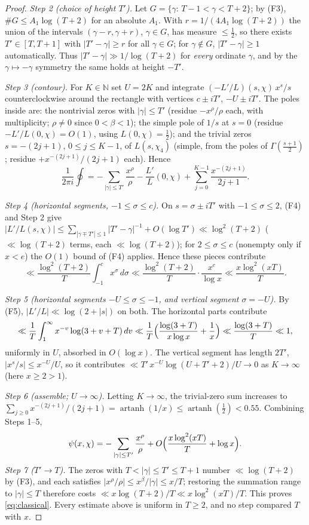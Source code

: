 \begin{proof}
\emph{Step 2 (choice of height $T'$).} Let
$G=\{\gamma:\,T-1<\gamma<T+2\}$; by (F3), $\#G\le A_1\log(T+2)$ for an
absolute $A_1$. With $r=1/(4A_1\log(T+2))$ the union of the intervals
$(\gamma-r,\gamma+r)$, $\gamma\in G$, has measure $\le\tfrac12$, so
there exists $T'\in[T,T+1]$ with $|T'-\gamma|\ge r$ for all
$\gamma\in G$; for $\gamma\notin G$, $|T'-\gamma|\ge1$ automatically.
Thus $|T'-\gamma|\gg1/\log(T+2)$ for \emph{every} ordinate $\gamma$,
and by the $\gamma\mapsto-\gamma$ symmetry the same holds at height
$-T'$.

\emph{Step 3 (contour).} For $K\in\mathbb N$ set $U=2K$ and integrate
$(-L'/L)(s,\chi)\,x^s/s$ counterclockwise around the rectangle with
vertices $c\pm iT'$, $-U\pm iT'$. The poles inside are: the nontrivial
zeros with $|\gamma|\le T'$ (residue $-x^\rho/\rho$ each, with
multiplicity; $\rho\ne0$ since $0<\beta<1$); the simple pole of $1/s$
at $s=0$ (residue $-L'/L(0,\chi)=O(1)$, using $L(0,\chi)=\tfrac12$);
and the trivial zeros $s=-(2j+1)$, $0\le j\le K-1$, of $L(s,\chi_4)$
(simple, from the poles of $\Gamma(\tfrac{s+1}2)$; residue
$+x^{-(2j+1)}/(2j+1)$ each). Hence
\[
\frac{1}{2\pi i}\oint
=-\sum_{|\gamma|\le T'}\frac{x^\rho}{\rho}-\frac{L'}{L}(0,\chi)
+\sum_{j=0}^{K-1}\frac{x^{-(2j+1)}}{2j+1}.
\]

\emph{Step 4 (horizontal segments, $-1\le\sigma\le c$).} On
$s=\sigma\pm iT'$ with $-1\le\sigma\le2$, (F4) and Step 2 give
$|L'/L(s,\chi)|\le\sum_{|\gamma\mp T'|\le1}|T'-\gamma|^{-1}
+O(\log T')\ll\log^2(T+2)$ ($\ll\log(T+2)$ terms, each
$\ll\log(T+2)$); for $2\le\sigma\le c$ (nonempty only if $x<e$) the
$O(1)$ bound of (F4) applies. Hence these pieces contribute
\[
\ll\frac{\log^2(T+2)}{T}\int_{-1}^{c}x^\sigma\,d\sigma
\ll\frac{\log^2(T+2)}{T}\cdot\frac{x^c}{\log x}
\ll\frac{x\log^2(xT)}{T}.
\]

\emph{Step 5 (horizontal segments $-U\le\sigma\le-1$, and vertical
segment $\sigma=-U$).} By (F5), $|L'/L|\ll\log(2+|s|)$ on both. The
horizontal parts contribute
\[
\ll\frac1T\int_{1}^{\infty}x^{-v}\log(3+v+T)\,dv
\ll\frac1T\Bigl(\frac{\log(3+T)}{x\log x}+\frac1x\Bigr)
\ll\frac{\log(3+T)}{T}\ll1,
\]
uniformly in $U$, absorbed in $O(\log x)$. The vertical segment has
length $2T'$, $|x^s/s|\le x^{-U}/U$, so it contributes
$\ll T'\,x^{-U}\log(U+T'+2)/U\to0$ as $K\to\infty$ (here $x\ge2>1$).

\emph{Step 6 (assemble; $U\to\infty$).} Letting $K\to\infty$, the
trivial-zero sum increases to
$\sum_{j\ge0}x^{-(2j+1)}/(2j+1)=\operatorname{artanh}(1/x)
\le\operatorname{artanh}(\tfrac12)<0.55$. Combining Steps 1--5,
\[
\psi(x,\chi)=-\sum_{|\gamma|\le T'}\frac{x^\rho}{\rho}
+O\Bigl(\frac{x\log^2(xT)}{T}+\log x\Bigr).
\]
\emph{Step 7 ($T'\to T$).} The zeros with $T<|\gamma|\le T'\le T+1$
number $\ll\log(T+2)$ by (F3), and each satisfies
$|x^\rho/\rho|\le x^{\beta}/|\gamma|\le x/T$; restoring the summation
range to $|\gamma|\le T$ therefore costs $\ll x\log(T+2)/T\ll
x\log^2(xT)/T$. This proves \eqref{eq:classical}. Every estimate above
is uniform in $T\ge2$, and no step compared $T$ with $x$.
\end{proof}


